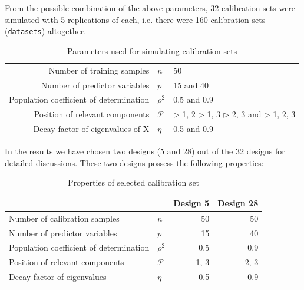 \documentclass[a4paper, 11pt]{article}
\begin{document}
From the possible combination of the above parameters, 32 calibration sets were simulated with 5 replications of each, i.e. there were 160 calibration sets ({\tt datasets}) altogether.

\bigskip

\begin{table}[ht]
  \centering
  \begin{tabular}{rll}
    Number of training samples              & $n$      & 50                \\
    Number of predictor variables           & $p$      & 15 and 40         \\
    Population coefficient of determination & $\rho^2$ & 0.5 and 0.9       \\
    Position of relevant components         & $\mathcal{P}$
                                            & $\triangleright$ 1, 2 \;
                                                 $\triangleright$ 1,  3 \; \newline
                                                 $\triangleright$ 2,  3 and \;
                                                 $\triangleright$ 1,  2, 3 \\
    Decay factor of eigenvalues of X        & $\eta$   & 0.5 and 0.9
  \end{tabular}
  \caption{Parameters used for simulating calibration sets}
  \label{tab:parameters}
\end{table}

\bigskip
 
In the results we have chosen two designs (5 and 28) out of the 32 designs for detailed discussions. These two designs possess the following properties:

\bigskip

\begin{table}[ht]
  \centering
  \begin{tabularx}{0.8\textwidth}{Xlrr}
    \hline
                                            &               & Design 5 & Design 28 \\
    \hline\hline
    Number of calibration samples           & $n$           & 50       & 50        \\
    Number of predictor variables           & $p$           & 15       & 40        \\
    Population coefficient of determination & $\rho^2$      & 0.5      & 0.9       \\
    Position of relevant components         & $\mathcal{P}$ & 1, 3     & 2, 3      \\
    Decay factor of eigenvalues           & $\eta$        & 0.5      & 0.9       \\
    \hline
  \end{tabularx}
  \caption{Properties of selected calibration set}
  \label{tab:selected-design}
\end{table}
\end{document}
